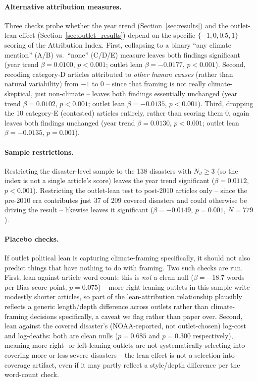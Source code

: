 \documentclass[12pt]{article}
\begin{document}
\paragraph{Alternative attribution measures.} Three checks probe whether
the year trend (Section~\ref{sec:results}) and the outlet-lean effect
(Section~\ref{sec:outlet_results}) depend on the specific
$\{-1,0,0.5,1\}$ scoring of the Attribution Index. First, collapsing to a
binary ``any climate mention'' (A/B) vs.\ ``none'' (C/D/E) measure leaves
both findings significant (year trend $\beta=0.0100$, $p<0.001$; outlet
lean $\beta=-0.0177$, $p<0.001$). Second, recoding category-D articles
attributed to \emph{other human causes} (rather than natural variability)
from $-1$ to $0$ -- since that framing is not really climate-skeptical,
just non-climate -- leaves both findings essentially unchanged (year trend
$\beta=0.0102$, $p<0.001$; outlet lean $\beta=-0.0135$, $p<0.001$). Third,
dropping the 10 category-E (contested) articles entirely, rather than
scoring them $0$, again leaves both findings unchanged (year trend
$\beta=0.0130$, $p<0.001$; outlet lean $\beta=-0.0135$, $p=0.001$).

\paragraph{Sample restrictions.} Restricting the disaster-level sample to
the 138 disasters with $N_d \geq 3$ (so the index is not a single
article's score) leaves the year trend significant
($\beta=0.0112$, $p<0.001$). Restricting the outlet-lean test to
post-2010 articles only -- since the pre-2010 era contributes just 37 of
209 covered disasters and could otherwise be driving the result --
likewise leaves it significant ($\beta=-0.0149$, $p=0.001$, $N=779$).

\paragraph{Placebo checks.} If outlet political lean is capturing
climate-framing specifically, it should not also predict things that have
nothing to do with framing. Two such checks are run. First, lean against
article word count: this is \emph{not} a clean null
($\beta=-18.7$ words per Bias-score point, $p=0.075$) -- more
right-leaning outlets in this sample write modestly shorter articles, so
part of the lean-attribution relationship plausibly reflects a generic
length/depth difference across outlets rather than climate-framing
decisions specifically, a caveat we flag rather than paper over. Second,
lean against the covered disaster's (NOAA-reported, not outlet-chosen)
log-cost and log-deaths: both are clean nulls ($p=0.685$ and $p=0.300$
respectively), meaning more right- or left-leaning outlets are not
systematically selecting into covering more or less severe disasters --
the lean effect is not a selection-into-coverage artifact, even if it may
partly reflect a style/depth difference per the word-count check.
\end{document}
